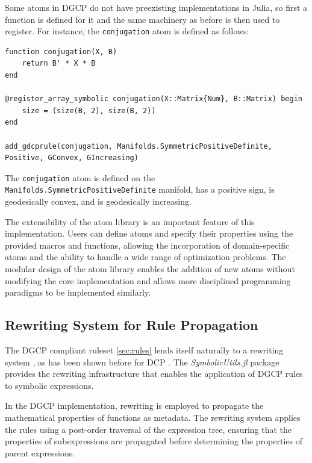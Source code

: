 \documentclass[twoside,11pt]{article}
\begin{document}
Some atoms in DGCP do not have preexisting implementations in Julia, so first a function is defined for it and the same machinery as before is then used to register. For instance, the \texttt{conjugation} atom is defined as follows:

\begin{listing}[h!]
\label{conjugation}
\begin{verbatim}
function conjugation(X, B)
    return B' * X * B
end

@register_array_symbolic conjugation(X::Matrix{Num}, B::Matrix) begin
    size = (size(B, 2), size(B, 2))
end

add_gdcprule(conjugation, Manifolds.SymmetricPositiveDefinite, Positive, GConvex, GIncreasing)
\end{verbatim}
\caption{The \texttt{conjugation} atom is defined on the \texttt{Manifolds.SymmetricPositiveDefinite} manifold, has a positive sign, is geodesically convex, and is geodesically increasing.}
\end{listing}

The extensibility of the atom library is an important feature of this implementation. Users can define atoms and specify their properties using the provided macros and functions, allowing the incorporation of domain-specific atoms and the ability to handle a wide range of optimization problems. The modular design of the atom library enables the addition of new atoms without modifying the core implementation and allows more disciplined programming paradigms to be implemented similarly.

\subsection{Rewriting System for Rule Propagation}

The DGCP compliant ruleset \ref{sec:rules} lends itself naturally to a rewriting system \citep{dershowitz1990rewrite}, as has been shown before for DCP \citep{agrawal2018rewriting}. The \textsl{SymbolicUtils.jl} package provides the rewriting infrastructure that enables the application of DGCP rules to symbolic expressions.

In the DGCP implementation, rewriting is employed to propagate the mathematical properties of functions as metadata. The rewriting system applies the rules using a post-order traversal of the expression tree, ensuring that the properties of subexpressions are propagated before determining the properties of parent expressions.
\end{document}
